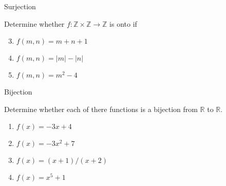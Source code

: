 \documentclass{beamer}
\begin{document}
\begin{frame}{Surjection}
    \begin{example}
        Determine whether $f: \mathbb{Z} \times \mathbb{Z} \to \mathbb{Z}$ is onto if
        \begin{enumerate}
            \setcounter{enumi}{2}
            \item $f(m,n) = m + n + 1$
            
            \vspace{12mm}

            \item $f(m,n) = |m| - |n|$
            
            \vspace{12mm}

            \item $f(m,n) = m^2 - 4$
            
            \vspace{14mm}

        \end{enumerate}
    \end{example}
\end{frame}

\begin{frame}{Bijection}
    \begin{example}
        Determine whether each of there functions is a bijection from $\mathbb{R}$ to $\mathbb{R}$.
        \begin{enumerate}
            \item $f(x) = -3x + 4$
            
            \vspace{8mm}

            \item $f(x) = -3x^2 + 7$
            
            \vspace{8mm}

            \item $f(x) = (x+1)/(x+2)$
            
            \vspace{8mm}

            \item $f(x) = x^5 + 1$
            
            \vspace{10mm}

        \end{enumerate}
    \end{example}
\end{frame}
\end{document}
